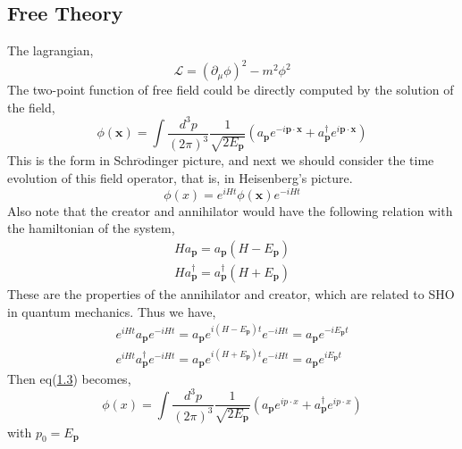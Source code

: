 \documentclass[12pt]{article}
\numberwithin{equation}{section}
\begin{document}
\subsection{Free Theory}
The lagrangian,
\begin{equation}
    \mathcal{L} = (\partial_{\mu}\phi)^2 - m^{2}\phi^2
\end{equation}
The two-point function of free field could be directly computed by the solution of the field,
\begin{equation}
    \phi(\mathbf{x}) = \int{\frac{d^3p}{(2\pi)^3}\frac{1}{\sqrt{2E_{\mathbf{p}}}}\left(a_{\mathbf{p}}e^{-i\mathbf{p}\cdot\mathbf{x}} + a^{\dagger}_{\mathbf{p}}e^{i\mathbf{p}\cdot\mathbf{x}}\right)}
\end{equation}\label{1.3}
This is the form in Schr$\ddot{\text{o}}$dinger picture, and next we should consider the time evolution of this field operator, that is, in Heisenberg's picture.
\begin{equation}
    \phi(x) = e^{iHt}\phi(\mathbf{x})e^{-iHt}
\end{equation}
Also note that the creator and annihilator would have the following relation with the hamiltonian of the system,
\begin{equation}
    \begin{split}
        Ha_{\mathbf{p}} = a_{\mathbf{p}}\left(H-E_{\mathbf{p}}\right)\\
        Ha_{\mathbf{p}}^{\dagger} = a_{\mathbf{p}}^{\dagger}\left(H+E_{\mathbf{p}}\right)
    \end{split}
\end{equation}
These are the properties of the annihilator and creator, which are related to SHO in quantum mechanics.
Thus we have,
\begin{equation}
    \begin{split}
        e^{iHt}a_{\mathbf{p}}e^{-iHt} = a_{\mathbf{p}}e^{i(H-E_{\mathbf{p}})t}e^{-iHt} = a_{\mathbf{p}}e^{-iE_{\mathbf{p}}t}\\
        e^{iHt}a^{\dagger}_{\mathbf{p}}e^{-iHt} = a_{\mathbf{p}}e^{i(H+E_{\mathbf{p}})t}e^{-iHt} = a_{\mathbf{p}}e^{iE_{\mathbf{p}}t}
    \end{split}
\end{equation}
Then eq(\hyperref[1.3]{1.3}) becomes,
\begin{equation}
    \phi(x) = \int{\frac{d^3p}{(2\pi)^3}\frac{1}{\sqrt{2E_{\mathbf{p}}}}\left(a_{\mathbf{p}}e^{ip\cdot x} + a^{\dagger}_{\mathbf{p}}e^{ip\cdot x}\right)}
\end{equation}
with $p_0 = E_{\mathbf{p}}$
\end{document}
